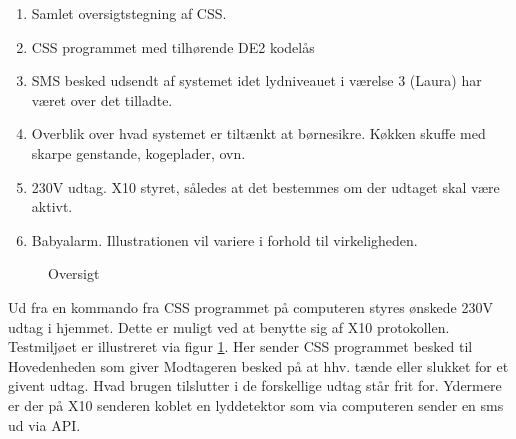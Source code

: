 \begin{enumerate}
\item Samlet oversigtstegning af CSS. 
\item CSS programmet med tilhørende DE2 kodelås
\item SMS besked udsendt af systemet idet lydniveauet i værelse 3 (Laura) har været over det tilladte.
\item Overblik over hvad systemet er tiltænkt at børnesikre. Køkken skuffe med skarpe genstande, kogeplader, ovn.
\item 230V udtag. X10 styret, således at det bestemmes om der udtaget skal være aktivt.
\item Babyalarm. Illustrationen vil variere i forhold til virkeligheden.
\end{enumerate}

\begin{figure}[h] \centering
{}
\caption{Oversigt}
\label{fig:plan_oversigt}
\end{figure}


Ud fra en kommando fra CSS programmet på computeren styres ønskede 230V udtag i hjemmet. Dette er muligt ved at benytte sig af X10 protokollen. Testmiljøet er illustreret via figur \ref{fig:plan_oversigt}. Her sender CSS programmet besked til Hovedenheden som giver Modtageren besked på at hhv. tænde eller slukket for et givent udtag. Hvad brugen tilslutter i de forskellige udtag står frit for. Ydermere er der på X10 senderen koblet en lyddetektor som via computeren sender en sms ud via API.